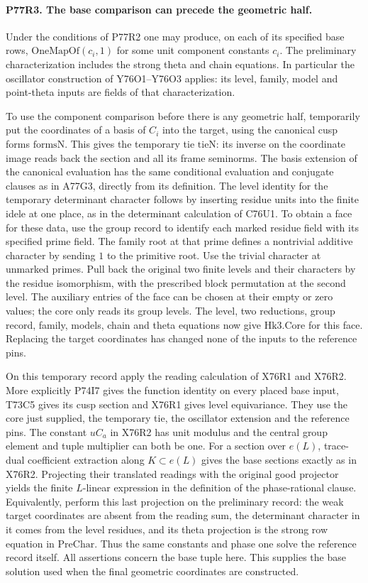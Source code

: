 \paragraph{P77R3. The base comparison can precede the geometric half.}
Under the conditions of P77R2 one may produce, on each of its
specified base rows, $\mathrm{OneMapOf}(c_i,1)$ for some unit
component constants $c_i$. The preliminary characterization
includes the strong theta and chain equations. In particular the
oscillator construction of Y76O1--Y76O3 applies: its level,
family, model and point-theta inputs are fields of that characterization.

To use the component comparison before there is any geometric
half, temporarily put the coordinates of a basis of $C_i$ into
the target, using the canonical cusp forms $\mathrm{formsN}$.
This gives the temporary tie $\mathrm{tieN}$: its inverse on the
coordinate image reads back the section and all its frame seminorms.
The basis extension of the canonical evaluation has the same
conditional evaluation and conjugate clauses as in A77G3, directly
from its definition. The level identity for the temporary determinant
character follows by inserting residue units into the finite idele
at one place, as in the determinant calculation of C76U1.
To obtain a face for these data, use the group record to identify
each marked residue field with its specified prime field. The
family root at that prime defines a nontrivial additive character
by sending $1$ to the primitive root. Use the trivial character
at unmarked primes. Pull back the original two finite levels and
their characters by the residue isomorphism, with the prescribed
block permutation at the second level. The auxiliary entries of
the face can be chosen at their empty or zero values; the core
only reads its group levels. The level, two reductions, group
record, family, models, chain and theta equations now give
$\mathrm{Hk3.Core}$ for this face. Replacing the target
coordinates has changed none of the inputs to the reference pins.

On this temporary record apply the reading calculation of X76R1
and X76R2. More explicitly P74I7 gives the function identity
on every placed base input, T73C5 gives its cusp section and
X76R1 gives level equivariance. They use the core just supplied,
the temporary tie, the oscillator extension and the reference
pins. The constant $uC_a$ in X76R2 has unit modulus and the
central group element and tuple multiplier can both be one.
For a section over $e(L)$, trace-dual coefficient extraction along
$K\subset e(L)$ gives the base sections exactly as in X76R2.
Projecting their translated readings with the original good
projector yields the finite $L$-linear expression in the definition
of the phase-rational clause. Equivalently, perform this last
projection on the preliminary record: the weak target coordinates
are absent from the reading sum, the determinant character in it
comes from the level residues, and its theta projection is the
strong row equation in $\mathrm{PreChar}$. Thus the same constants
and phase one solve the reference record itself. All assertions
concern the base tuple here. This supplies the base solution used
when the final geometric coordinates are constructed.
